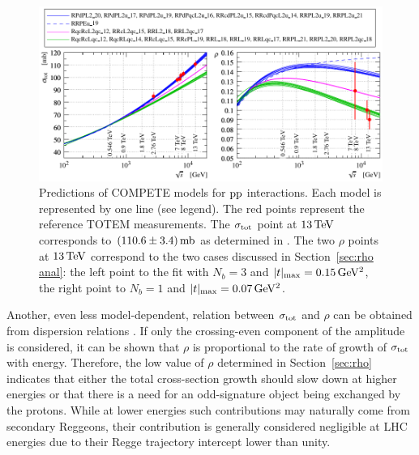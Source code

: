 \begin{figure}
\vskip-5mm
\begin{center}
\includegraphics{fig/compete_bands_si_tot_rho.pdf}
\caption{%
Predictions of COMPETE models \cite{compete-details} for $\rm pp$ interactions. Each model is represented by one line (see legend). The red points represent the reference TOTEM measurements. The $\sigma_{\rm tot}$ point at $13\,{\rm TeV}$ corresponds to $(110.6 \pm 3.4)\,{\rm mb}$ as determined in \cite{totem-13tev-90m}. The two $\rho$ points at $13\,{\rm TeV}$ correspond to the two cases discussed in Section~\ref{sec:rho anal}: the left point to the fit with $N_b=3$ and $|t|_{\rm max} = 0.15\,{\rm GeV^2}$, the right point to $N_b=1$ and $|t|_{\rm max} = 0.07\,{\rm GeV^2}$.
}
\label{fig:comp bands}
\end{center}
\end{figure}

Another, even less model-dependent, relation between $\sigma_{\rm tot}$ and $\rho$ can be obtained from dispersion relations \cite{dremin-dispersion,barone-predazzi}. If only the crossing-even component of the amplitude is considered, it can be shown that $\rho$ is proportional to the rate of growth of $\sigma_{\rm tot}$ with energy. Therefore, the low value of $\rho$ determined in Section~\ref{sec:rho} indicates that either the total cross-section growth should slow down at higher energies or that there is a need for an odd-signature object being exchanged by the protons. While at lower energies such contributions may naturally come from secondary Reggeons, their contribution is generally considered negligible at LHC energies due to their Regge trajectory intercept lower than unity.

